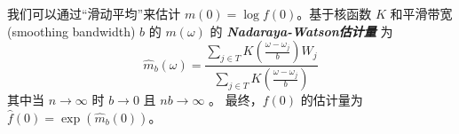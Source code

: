 我们可以通过``滑动平均''来估计 $m(0) = \log f(0)$。基于核函数 $K$ 和平滑带宽 (smoothing bandwidth) $b$ 的 $m(\omega)$ 的 \textbf{\emph{Nadaraya-Watson估计量 }} 为
\[\widehat{m}_b(\omega) = \frac{\sum_{j\in T } K\left(\frac{\omega - \omega_j}{b}\right) W_j}{\sum_{j\in T } K\left(\frac{\omega - \omega_j}{b}\right)}\]
其中当 $n\to\infty$ 时 $b \to 0$ 且 $nb \to \infty$ 。 最终，$f(0)$ 的估计量为 $\widehat{f}(0) = \exp(\widehat{m}_b(0))$。
